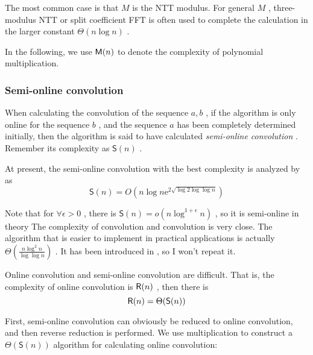 The most common case is that $ M $ is the NTT modulus. For general $ M $ , three-modulus NTT or split coefficient FFT is often used to complete the calculation in the larger constant $ \Theta (n \log n) $ .

In the following, we use $  \mathsf M (n) $ to denote the complexity of polynomial multiplication.

\subsubsection { Semi-online convolution }

\begin { definition }
When calculating the convolution of the sequence $ a, b $ , if the algorithm is only online for the sequence $ b $ , and the sequence $ a $ has been completely determined initially, then the algorithm is said to have calculated \emph { semi-online convolution }. Remember its complexity as $ \mathsf S(n) $ .
\end { definition }

\begin { theorem }

At present, the semi-online convolution with the best complexity is analyzed by \cite { relaxmul } as
$$
\mathsf {S}(n) = O \left (n \log n \mathrm {e}^{2 \sqrt { \log 2 \log\log n}} \right )
$$
\end { theorem }

Note that for $ \forall  \epsilon > 0 $ , there is $ \mathsf {S}(n) = o \left (n \log ^{1+ \epsilon } n \right ) $ , so it is semi-online in theory The complexity of convolution and convolution is very close. The algorithm that is easier to implement in practical applications is actually $ \Theta  \left ( \frac {n \log ^2 n}{ \log  \log n} \right ) $ . It has been introduced in \cite { nimberpoly }, so I won’t repeat it.

\begin { theorem }
Online convolution and semi-online convolution are difficult. That is, the complexity of online convolution is $  \mathsf R (n) $ , then there is
$$
 \mathsf R (n)= \Theta ( \mathsf S(n))
$$
\end { theorem }

First, semi-online convolution can obviously be reduced to online convolution, and then reverse reduction is performed. We use multiplication to construct a $ \Theta ( \mathsf S(n)) $ algorithm for calculating online convolution:

